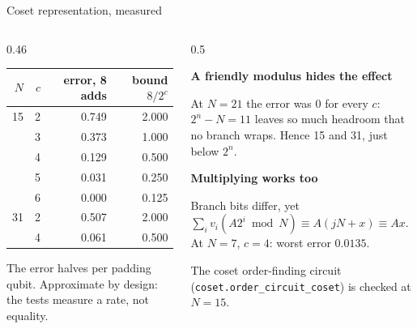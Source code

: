 \documentclass[aspectratio=169,11pt]{beamer}
\newcommand{\blocktitle}[1]{{\bfseries #1}\par\vskip1mm}
\newcommand{\peachtitle}[1]{{\bfseries\color{cverm}#1}\par\vskip1mm}
\begin{document}
\begin{frame}{Coset representation, measured}
  \begin{columns}[T]
    \begin{column}{0.46\textwidth}
      \centering\footnotesize
      \renewcommand{\arraystretch}{1.04}
      \begin{tabular}{@{}rrrr@{}}
        \toprule
        $N$ & $c$ & error, 8 adds & bound $8/2^c$ \\
        \midrule
        15 & 2 & 0.749 & 2.000 \\
           & 3 & 0.373 & 1.000 \\
           & 4 & 0.129 & 0.500 \\
           & 5 & 0.031 & 0.250 \\
           & 6 & 0.000 & 0.125 \\
        \midrule
        31 & 2 & 0.507 & 2.000 \\
           & 4 & 0.061 & 0.500 \\
        \bottomrule
      \end{tabular}\par
      {\scriptsize The error halves per padding qubit. Approximate by design: the tests measure a rate, not equality.}
    \end{column}
    \begin{column}{0.5\textwidth}
      \begin{peachblock}[fontupper=\small]\peachtitle{A friendly modulus hides the effect}
        At $N=21$ the error was 0 for every $c$: $2^n-N=11$ leaves so much headroom that no branch wraps. Hence 15 and 31, just below $2^n$.
      \end{peachblock}
      \small
      \blocktitle{Multiplying works too}
      Branch bits differ, yet $\sum_iv_i(A2^i\bmod N)\equiv A(jN+x)\equiv Ax$. At $N=7$, $c=4$: worst error $0.0135$.\par
      \vskip1mm
      The coset order-finding circuit (\texttt{coset.order\_circuit\_coset}) is checked at $N=15$.
    \end{column}
  \end{columns}
\end{frame}
\end{document}
